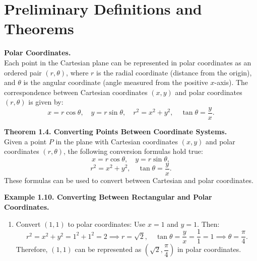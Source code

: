\documentclass{article}
\begin{document}
\renewcommand{\familydefault}{\rmdefault}



\newpage
\tableofcontents
\newpage



\section*{Preliminary Definitions and Theorems}

\begin{definitionbox}
\textbf{Polar Coordinates.} \\
Each point in the Cartesian plane can be represented in polar coordinates as an ordered pair $(r, \theta)$, where $r$ is the radial coordinate (distance from the origin), and $\theta$ is the angular coordinate (angle measured from the positive $x$-axis).  
The correspondence between Cartesian coordinates $(x, y)$ and polar coordinates $(r, \theta)$ is given by:
\[
x = r\cos\theta, \quad y = r\sin\theta, \quad r^2 = x^2 + y^2, \quad \tan\theta = \frac{y}{x}.
\]
\end{definitionbox}

\begin{theorembox}
\textbf{Theorem 1.4. Converting Points Between Coordinate Systems.} \\
Given a point $P$ in the plane with Cartesian coordinates $(x, y)$ and polar coordinates $(r, \theta)$, the following conversion formulas hold true:
\[
x = r\cos\theta, \quad y = r\sin\theta,
\]
\[
r^2 = x^2 + y^2, \quad \tan\theta = \frac{y}{x}.
\]
These formulas can be used to convert between Cartesian and polar coordinates.
\end{theorembox}

\begin{examplebox}
\textbf{Example 1.10. Converting Between Rectangular and Polar Coordinates.}
\begin{enumerate}
    \item Convert $(1, 1)$ to polar coordinates:  
    Use $x = 1$ and $y = 1$. Then:
    \[
    r^2 = x^2 + y^2 = 1^2 + 1^2 = 2 \implies r = \sqrt{2}, \quad \tan\theta = \frac{y}{x} = \frac{1}{1} = 1 \implies \theta = \frac{\pi}{4}.
    \]
    Therefore, $(1, 1)$ can be represented as $(\sqrt{2}, \dfrac{\pi}{4})$ in polar coordinates.
\end{enumerate}
\end{examplebox}
\end{document}
